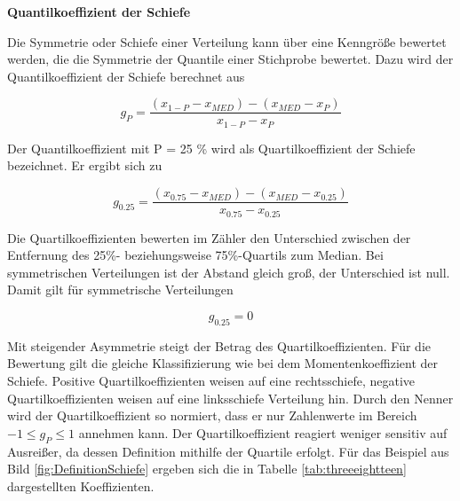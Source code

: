 {\selectfont
\noindent\textbf{Quantilkoeffizient der Schiefe}}

\noindent Die Symmetrie oder Schiefe einer Verteilung kann \"{u}ber eine Kenngr\"{o}{\ss}e bewertet werden, die die Symmetrie der Quantile einer Stichprobe bewertet. Dazu wird der Quantilkoeffizient der Schiefe berechnet aus

\begin{equation}\label{eq:threefiftyone}
g_{P} =\dfrac{(x_{1-P} -x_{MED})-(x_{MED} -x_{P})}{x_{1-P} -x_{P}}
\end{equation} 

\noindent Der Quantilkoeffizient mit P = 25 \% wird als Quartilkoeffizient der Schiefe bezeichnet. Er ergibt sich zu

\begin{equation}\label{eq:threefiftytwo}
g_{0.25} =\dfrac{(x_{0.75} -x_{MED})-(x_{MED} -x_{0.25})}{x_{0.75} -x_{0.25}}
\end{equation} 

\noindent Die Quartilkoeffizienten bewerten im Z\"{a}hler den Unterschied zwischen der Entfernung des 25\%- beziehungsweise 75\%-Quartils zum Median. Bei symmetrischen Verteilungen ist der Abstand gleich gro{\ss}, der Unterschied ist null. Damit gilt f\"{u}r symmetrische Verteilungen 

\begin{equation}\label{eq:threefiftythree}
g_{0.25} =0
\end{equation} 

\noindent Mit steigender Asymmetrie steigt der Betrag des Quartilkoeffizienten. F\"{u}r die Bewertung gilt die gleiche Klassifizierung wie bei dem Momentenkoeffizient der Schiefe. Positive Quartilkoeffizienten weisen auf eine rechtsschiefe, negative Quartilkoeffizienten weisen auf eine linksschiefe Verteilung hin. Durch den Nenner wird der Quartilkoeffizient so normiert, dass er nur Zahlenwerte im Bereich  $- 1 \leq g_{P} \leq 1$ annehmen kann. Der Quartilkoeffizient reagiert weniger sensitiv auf Ausrei{\ss}er, da dessen Definition mithilfe der Quartile erfolgt. F\"{u}r das Beispiel aus Bild \ref{fig:DefinitionSchiefe} ergeben sich die in Tabelle \ref{tab:threeeightteen} dargestellten Koeffizienten.

